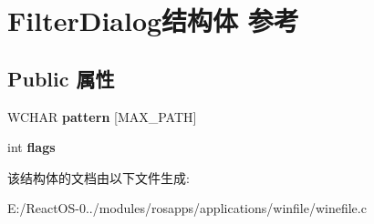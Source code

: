 \hypertarget{struct_filter_dialog}{}\section{Filter\+Dialog结构体 参考}
\label{struct_filter_dialog}
\subsection*{Public 属性}
\begin{DoxyCompactItemize}
\item 
\mbox{\label{struct_filter_dialog_a0cffde3d026129794527a688982d2fd8}} 
W\+C\+H\+AR {\bfseries pattern} \mbox{[}M\+A\+X\+\_\+\+P\+A\+TH\mbox{]}
\item 
\mbox{\label{struct_filter_dialog_a1f4900a94daff4bfbafbb40d9c87c52c}} 
int {\bfseries flags}
\end{DoxyCompactItemize}


该结构体的文档由以下文件生成\+:\begin{DoxyCompactItemize}
\item 
E\+:/\+React\+O\+S-\/0../modules/rosapps/applications/winfile/winefile.\+c\end{DoxyCompactItemize}
